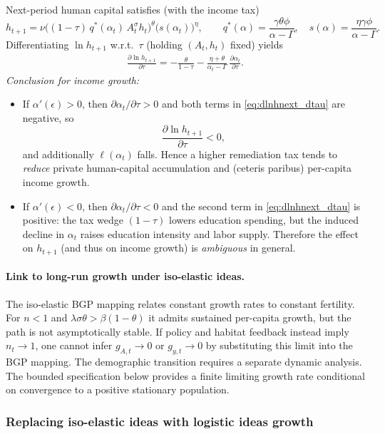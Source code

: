 \documentclass[11pt]{article}
\begin{document}
Next-period human capital satisfies (with the income tax)
\[
h_{t+1}
=
\nu\Big((1-\tau)\,q^\ast(\alpha_t)\,A_t^\sigma h_t\Big)^\theta \Big(s(\alpha_t)\Big)^\eta,
\qquad
q^\ast(\alpha)=\frac{\gamma\theta\phi}{\alpha-\Gamma},
\quad
s(\alpha)=\frac{\eta\gamma\phi}{\alpha-\Gamma}.
\]
Differentiating $\ln h_{t+1}$ w.r.t.\ $\tau$ (holding $(A_t,h_t)$ fixed) yields
\begin{align}
\frac{\partial \ln h_{t+1}}{\partial \tau}
=
-\frac{\theta}{1-\tau}
-\frac{\eta+\theta}{\alpha_t-\Gamma}\,\frac{\partial \alpha_t}{\partial \tau}.
\label{eq:dlnhnext_dtau}
\end{align}
\emph{Conclusion for income growth:}
\begin{itemize}
\item If $\alpha'(\epsilon)>0$, then $\partial \alpha_t/\partial\tau>0$ and both terms in \eqref{eq:dlnhnext_dtau} are negative, so
\[
\frac{\partial \ln h_{t+1}}{\partial \tau}<0,
\]
and additionally $\ell(\alpha_t)$ falls. Hence a higher remediation tax tends to \emph{reduce} private human-capital accumulation and (ceteris paribus) per-capita income growth.
\item If $\alpha'(\epsilon)<0$, then $\partial \alpha_t/\partial\tau<0$ and the second term in \eqref{eq:dlnhnext_dtau} is positive:
the tax wedge $(1-\tau)$ lowers education spending, but the induced decline in $\alpha_t$ raises education intensity and labor supply.
Therefore the effect on $h_{t+1}$ (and thus on income growth) is \emph{ambiguous} in general.
\end{itemize}

\paragraph{Link to long-run growth under iso-elastic ideas.}
The iso-elastic BGP mapping relates constant growth rates to constant fertility. For $n<1$ and
$\lambda\sigma\theta>\beta(1-\theta)$ it admits sustained per-capita growth, but the path is
not asymptotically stable. If policy and habitat feedback instead imply $n_t\to1$, one cannot
infer $g_{A,t}\to0$ or $g_{y,t}\to0$ by substituting this limit into the BGP mapping.
The demographic transition requires a separate dynamic analysis. The bounded specification below
provides a finite limiting growth rate conditional on convergence to a positive stationary population.

\subsubsection{Replacing iso-elastic ideas with logistic ideas growth}
\end{document}
